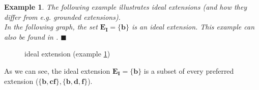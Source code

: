 \documentclass[12pt]{report}
\numberwithin{figure}{chapter}
\theoremstyle{break}
\newtheorem{exmpl}{Example}[chapter]
\newenvironment{myexmpl}{\begin{exmpl}}{$\blacksquare$ \end{exmpl}}
\begin{document}
\begin{myexmpl}
The following example illustrates ideal extensions (and how they differ from e.g. grounded extensions).\\
In the following graph, the set $\bm{E_{I}=\{b\}}$ is an ideal extension. This example can also be found in \cite{Dung2}.
\label{ideal extension}
\end{myexmpl}
\begin{figure}[h!]
\begin{center}\end{center}
\caption{ideal extension (example \ref{ideal extension})}
\end{figure}

As we can see, the ideal extension $\bm{E_{I}=\{b\}}$ is a subset of every preferred extension ($\bm{\{b,cf\},\{b,d,f\}}$).

\newpage
\end{document}
